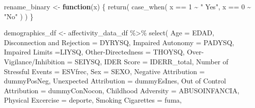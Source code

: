 \documentclass[
  letterpaper,
  DIV=11,
  numbers=noendperiod]{scrartcl}
\newenvironment{Shaded}{\begin{snugshade}}{\end{snugshade}}
\newcommand{\AttributeTok}[1]{\textcolor[rgb]{0.40,0.45,0.13}{#1}}
\newcommand{\ControlFlowTok}[1]{\textcolor[rgb]{0.00,0.23,0.31}{\textbf{#1}}}
\newcommand{\DecValTok}[1]{\textcolor[rgb]{0.68,0.00,0.00}{#1}}
\newcommand{\FunctionTok}[1]{\textcolor[rgb]{0.28,0.35,0.67}{#1}}
\newcommand{\NormalTok}[1]{\textcolor[rgb]{0.00,0.23,0.31}{#1}}
\newcommand{\OtherTok}[1]{\textcolor[rgb]{0.00,0.23,0.31}{#1}}
\newcommand{\SpecialCharTok}[1]{\textcolor[rgb]{0.37,0.37,0.37}{#1}}
\newcommand{\StringTok}[1]{\textcolor[rgb]{0.13,0.47,0.30}{#1}}
\begin{document}
\begin{Shaded}
\begin{Highlighting}[]
\NormalTok{rename\_binary }\OtherTok{\textless{}{-}} \ControlFlowTok{function}\NormalTok{(x) \{}
  \FunctionTok{return}\NormalTok{(}
    \FunctionTok{case\_when}\NormalTok{(}
\NormalTok{      x }\SpecialCharTok{==} \DecValTok{1} \SpecialCharTok{\textasciitilde{}} \StringTok{" Yes"}\NormalTok{,}
\NormalTok{      x }\SpecialCharTok{==} \DecValTok{0} \SpecialCharTok{\textasciitilde{}} \StringTok{"No"}
\NormalTok{    )}
\NormalTok{  )}
\NormalTok{\}}

\NormalTok{demographics\_df }\OtherTok{\textless{}{-}}
\NormalTok{  affectivity\_data\_df  }\SpecialCharTok{\%\textgreater{}\%}
  \FunctionTok{select}\NormalTok{(}
    \AttributeTok{Age =}\NormalTok{ EDAD,}
    \StringTok{\textasciigrave{}}\AttributeTok{Disconnection and Rejection}\StringTok{\textasciigrave{}} \OtherTok{=}\NormalTok{ DYRYSQ, }
    \StringTok{\textasciigrave{}}\AttributeTok{Impaired Autonomy}\StringTok{\textasciigrave{}} \OtherTok{=}\NormalTok{ PADYSQ, }
    \StringTok{\textasciigrave{}}\AttributeTok{Impaired Limits}\StringTok{\textasciigrave{}} \OtherTok{=}\NormalTok{LIYSQ, }
    \StringTok{\textasciigrave{}}\AttributeTok{Other{-}Directedness}\StringTok{\textasciigrave{}} \OtherTok{=}\NormalTok{ THOYSQ, }
    \StringTok{\textasciigrave{}}\AttributeTok{Over{-}Vigilance/Inhibition}\StringTok{\textasciigrave{}} \OtherTok{=}\NormalTok{ SEIYSQ,}
    \StringTok{\textasciigrave{}}\AttributeTok{IDER Score}\StringTok{\textasciigrave{}} \OtherTok{=}\NormalTok{ IDERR\_total, }
    \StringTok{\textasciigrave{}}\AttributeTok{Number of Stressful Events}\StringTok{\textasciigrave{}} \OtherTok{=}\NormalTok{ ESVfrec, }
    \AttributeTok{Sex =}\NormalTok{ SEXO,}
    \StringTok{\textasciigrave{}}\AttributeTok{Negative Attribution}\StringTok{\textasciigrave{}} \OtherTok{=}\NormalTok{ dummyPosNeg, }
    \StringTok{\textasciigrave{}}\AttributeTok{Unexpected Attribution}\StringTok{\textasciigrave{}} \OtherTok{=}\NormalTok{ dummyEsInes, }
    \StringTok{\textasciigrave{}}\AttributeTok{Out of Control Attribution}\StringTok{\textasciigrave{}}  \OtherTok{=}\NormalTok{ dummyConNocon,}
    \StringTok{\textasciigrave{}}\AttributeTok{Childhood Adversity}\StringTok{\textasciigrave{}} \OtherTok{=}\NormalTok{ ABUSOINFANCIA, }
    \StringTok{\textasciigrave{}}\AttributeTok{Physical Excercise}\StringTok{\textasciigrave{}} \OtherTok{=}\NormalTok{ deporte, }
    \StringTok{\textasciigrave{}}\AttributeTok{Smoking Cigarettes}\StringTok{\textasciigrave{}} \OtherTok{=}\NormalTok{ fuma, }

\end{Highlighting}
\end{Shaded}
\end{document}
